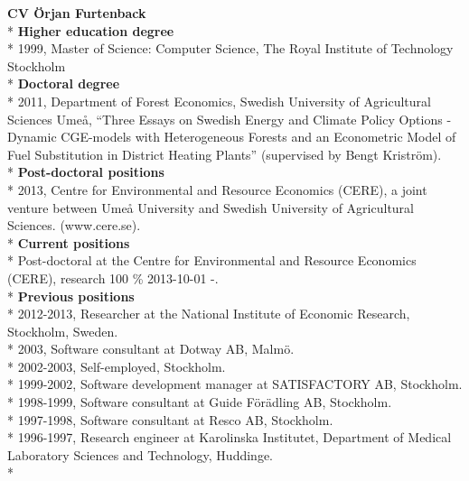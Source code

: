 \documentclass[11pt,a4paper]{extarticle}
\begin{document}
\pagebreak
\textbf{CV Örjan Furtenback}\\*
\textbf{Higher education degree}\\*
1999, Master of Science: Computer Science, The Royal Institute of Technology Stockholm\\*
\textbf{Doctoral degree}\\*
2011, Department of Forest Economics, Swedish University of Agricultural Sciences Umeå, “Three Essays on Swedish Energy and Climate Policy Options -
Dynamic CGE-models with Heterogeneous Forests and an Econometric Model of Fuel
Substitution in District Heating Plants” (supervised by Bengt Kriström).\\*
\textbf{Post-doctoral positions}\\*
2013, Centre for Environmental and Resource Economics (CERE),  a joint venture between Umeå University and Swedish University of Agricultural Sciences. (www.cere.se).\\*
\textbf{Current positions}\\*
Post-doctoral at the Centre for Environmental and Resource Economics (CERE), research 100 \% 2013-10-01 -.\\*
\textbf{Previous positions}\\*
2012-2013, Researcher at the National Institute of Economic Research, Stockholm, Sweden.\\*
2003, Software consultant at Dotway AB, Malmö.\\*
2002-2003, Self-employed, Stockholm.\\*
1999-2002, Software development manager at SATISFACTORY AB, Stockholm.\\*
1998-1999, Software consultant at Guide Förädling AB, Stockholm.\\*
1997-1998, Software consultant at Resco AB, Stockholm.\\*
1996-1997, Research engineer at Karolinska Institutet, Department of Medical Laboratory Sciences and Technology, Huddinge.\\*
\end{document}
